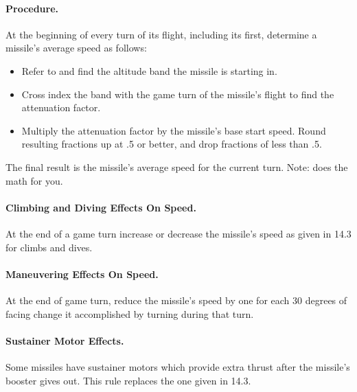 \begin{advancedrules}
{\paragraph{Procedure.} At the beginning of every turn of its flight, including its first, determine a missile's average speed as follows:

\begin{itemize}

    \item Refer to  and find the altitude band the missile is starting in.

    \item Cross index the band with the game turn of the missile's flight to find the attenuation factor.

    \item Multiply the attenuation factor by the missile's base start speed. Round resulting fractions up at .5 or better, and drop fractions of less than .5.

\end{itemize}

The final result is the missile's average speed for the current turn. Note:  does the math for you.

\paragraph{Climbing and Diving Effects On Speed.} At the end of a game turn increase or decrease the missile's speed as given in 14.3 for climbs and dives.

\paragraph{Maneuvering Effects On Speed.} At the end of game turn, reduce the missile's speed by one for each 30 degrees of facing change it accomplished by turning during that turn.

\paragraph{Sustainer Motor Effects.} Some missiles have sustainer motors which provide extra thrust after the missile's booster gives out. This rule replaces the one given in 14.3.

}
\end{advancedrules}
